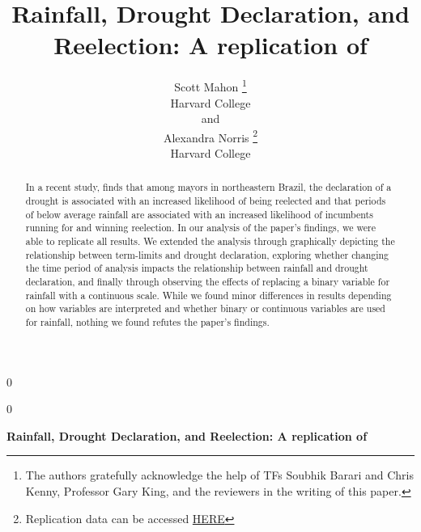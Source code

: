 \documentclass[12pt]{article}
\newcommand{\blind}{0}
\begin{document}
\def\spacingset#1{\renewcommand{\baselinestretch}%
{#1}\small\normalsize} \spacingset{1}



\blind
{
  \title{\bf Rainfall, Drought Declaration, and Reelection: A
replication of \citet{cooperman2021natural}}

  \author{
        Scott Mahon \thanks{The authors gratefully acknowledge the help
of TFs Soubhik Barari and Chris Kenny, Professor Gary King, and the
reviewers in the writing of this paper.} \\
    Harvard College\\
     and \\     Alexandra Norris \thanks{Replication data can be
accessed
\href{https://dataverse.harvard.edu/dataset.xhtml?persistentId=doi:10.7910/DVN/P6WM4E}{HERE}} \\
    Harvard College\\
      }
  \maketitle
} \fi

\blind
{
  \bigskip
  \bigskip
  \bigskip
  \begin{center}
    {\LARGE\bf Rainfall, Drought Declaration, and Reelection: A
replication of \citet{cooperman2021natural}}
  \end{center}
  \medskip
} \fi

\bigskip
\begin{abstract}
In a recent study, \citet{cooperman2021natural} finds that among mayors
in northeastern Brazil, the declaration of a drought is associated with
an increased likelihood of being reelected and that periods of below
average rainfall are associated with an increased likelihood of
incumbents running for and winning reelection. In our analysis of the
paper's findings, we were able to replicate all results. We extended the
analysis through graphically depicting the relationship between
term-limits and drought declaration, exploring whether changing the time
period of analysis impacts the relationship between rainfall and drought
declaration, and finally through observing the effects of replacing a
binary variable for rainfall with a continuous scale. While we found
minor differences in results depending on how variables are interpreted
and whether binary or continuous variables are used for rainfall,
nothing we found refutes the paper's findings.
\end{abstract}
\end{document}
